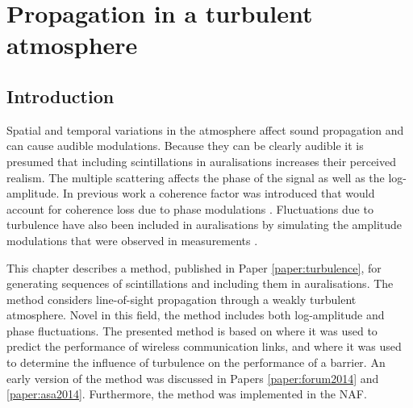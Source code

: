 \chapter{Propagation in a turbulent atmosphere}\label{chapter:turbulence} %

\section{Introduction}
Spatial and temporal variations in the atmosphere affect sound propagation and
can cause audible modulations. Because they can be clearly audible it is
presumed that including scintillations in auralisations increases their
perceived realism. The multiple scattering affects the phase of the signal as
well as the log-amplitude. In previous work a coherence factor was introduced
that would account for coherence loss due to phase modulations \cite{Shin2006,
Arntzen2014b, Arntzen2014a}. Fluctuations due to turbulence have also been
included in auralisations by simulating the amplitude modulations that were
observed in measurements \cite{Heutschi2014, Minard2016}.

This chapter describes a method, published in Paper \ref{paper:turbulence}, for
generating sequences of scintillations and including them in auralisations. The
method considers line-of-sight propagation through a weakly turbulent
atmosphere. Novel in this field, the method includes both log-amplitude and
phase fluctuations. The presented method is based on \cite{Jurado-navas2006}
where it was used to predict the performance of wireless communication links,
and \cite{Forssen2000} where it was used to determine the influence of
turbulence on the performance of a barrier. An early version of the method was
discussed in Papers \ref{paper:forum2014} and \ref{paper:asa2014}.
Furthermore, the method was implemented in the NAF\cite{Aumann2017}.


